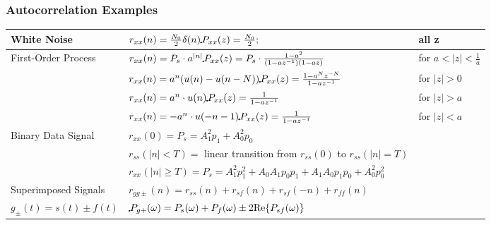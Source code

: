 		\subsubsection{Autocorrelation Examples}
		\begin{tabular}{|l|l|l|}
			\hline
				White Noise
				& $r_{xx} (n) = \frac {N_0}{2} \delta(n) \FT P_{xx}(z)= \frac {N_0}{2};\hspace{0.25cm}$ & all z\\
			\hline
				First-Order Process
				& $r_{xx} (n) = P_s \cdot a^{|n|} \FT P_{xx} (z) = P_s \cdot \frac {1-a^2}{(1-az^{-1})(1-az)}$ & for $a<|z| < \frac{1}{a}$\\
			\hline

				& $r_{xx} (n) = a^n(u(n) - u(n-N)) \FT P_{xx} (z) = \frac{1-a^Nz^{-N}}{1-az^{-1}}$ & for $|z| > 0$\\
			\hline

				& $r_{xx} (n) = a^n \cdot u(n) \FT P_{xx} (z) = \frac{1}{1-az^{-1}}$ & for $|z| > a$\\
			\hline

				& $r_{xx} (n) = -a^n \cdot u(-n-1) \FT P_{xx} (z) = \frac{1}{1-az^{-1}}$ & for $|z| < a$\\
			\hline
				Binary Data Signal
				& $r_{xx} (0) = P_s = A_1^2p_1 + A_0^2 p_0 $ &\\
				&$r_{ss} (|n| < T) = $ linear transition from $r_{ss}(0)$ to $r_{ss} (|n| = T)$ &\\
				& $r_{xx} (|n| \geq T) = P_s = A_1^2p_1^2 + A_0A_1p_0p_1 + A_1A_0p_1p_0 + A_0^2p_0^2$ &  \\
			\hline
				Superimposed Signals
				& $r_{gg\pm}(n) = r_{ss}(n) + r_{sf}(n) + r_{sf}(-n) + r_{ff}(n) $ &\\
				$g_\pm(t) = s(t) \pm f(t)$
				&  $\FT P_{g+}(\omega) = P_{s}(\omega) + P_{f}(\omega) \pm 2 \text{Re} \{P_{sf}(\omega) \}$ &\\
			\hline
		\end{tabular}
		\vspace{-0.5cm}
